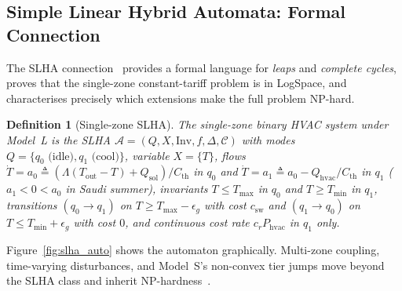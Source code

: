 \documentclass[3p,number]{elsarticle}
\let\oldsubsection\subsection
\renewcommand{\subsection}{\FloatBarrier\oldsubsection}
\newtheorem{definition}{Definition} \newtheorem{proposition}{Proposition} \newtheorem{remark}{Remark} \newtheorem{observation}{Observation}
\newcommand{\Tmin}{T_{\min}}
\newcommand{\Tmax}{T_{\max}}
\newcommand{\Tout}{T_{\mathrm{out}}}
\newcommand{\Cth}{C_{\mathrm{th}}}
\newcommand{\Qhvac}{Q_{\mathrm{hvac}}}
\newcommand{\csw}{c_{\mathrm{sw}}}
\newcommand{\Phvac}{P_{\mathrm{hvac}}}
\begin{document}
\subsection{Simple Linear Hybrid Automata: Formal Connection}
\label{subsec:slha}
 
The SLHA connection~\cite{Mousa2016} provides a formal language for \emph{leaps} and \emph{complete cycles}, proves that the single-zone constant-tariff problem is in LogSpace, and characterises precisely which extensions make the full problem NP-hard.
 
\begin{definition}[Single-zone SLHA]
\label{def:slha}
The single-zone binary HVAC system under Model~L is the SLHA
$\mathcal{A}=(Q,X,\mathrm{Inv},f,\Delta,\mathcal{C})$ with
modes $Q=\{q_0\text{ (idle)},q_1\text{ (cool)}\}$, variable $X=\{T\}$,
flows $\dot{T}{=}a_0\triangleq(\Lambda(\Tout-T)+Q_{\mathrm{sol}})/\Cth$
in $q_0$ and $\dot{T}{=}a_1\triangleq a_0-\Qhvac/\Cth$ in $q_1$
($a_1<0<a_0$ in Saudi summer),
invariants $T\!\le\!\Tmax$ in $q_0$ and $T\!\ge\!\Tmin$ in $q_1$,
transitions $(q_0\!\to\!q_1)$ on $T\!\ge\!\Tmax\!-\!\epsilon_g$ with
cost $\csw$ and $(q_1\!\to\!q_0)$ on $T\!\le\!\Tmin\!+\!\epsilon_g$
with cost $0$, and continuous cost rate $c_r\Phvac$ in $q_1$ only.
\end{definition}
 
Figure~\ref{fig:slha_auto} shows the automaton graphically.
Multi-zone coupling, time-varying disturbances, and Model~S's non-convex tier jumps move beyond the SLHA class and inherit NP-hardness~\cite{Mousa2017}.
 
\end{document}
